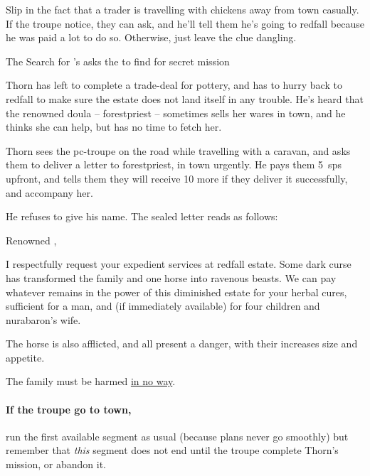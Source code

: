 Slip in the fact that a trader is travelling with chickens away from \gls{town} casually.
If the troupe notice, they can ask, and he'll tell them he's going to \gls{redfall} because he was paid a lot to do so.
Otherwise, just leave the clue dangling.

{The Search for }%
{'s  asks the  to find  for secret mission}%
\label{nonstarter}

\begin{exampletext}
  Thorn has left to complete a trade-deal for pottery, and has to hurry back to \gls{redfall} to make sure the estate does not land itself in any trouble.
  He's heard that the renowned \gls{doula} -- \gls{forestpriest} -- sometimes sells her wares in \gls{town}, and he thinks she can help, but has no time to fetch her.
\end{exampletext}

Thorn sees the \gls{pc}-troupe on the road while travelling with a caravan, and asks them to deliver a letter to \gls{forestpriest}, in \gls{town} urgently.
He pays them 5~\glspl{sp} upfront, and tells them they will receive 10 more if they deliver it successfully, and accompany her.

He refuses to give his name.
The sealed letter reads as follows:

\null
\begin{speechtext}
  Renowned ,

  I respectfully request your expedient services at \gls{redfall} estate.
  Some dark curse has transformed the family and one horse into ravenous beasts.
  We can pay whatever remains in the power of this diminished estate for your herbal cures, sufficient for a man, and (if immediately available) for four children and \gls{nurabaron}'s wife.

  The horse is also afflicted, and all present a danger, with their increases size and appetite.

  The family must be harmed \underline{in no way}.
\end{speechtext}

\thornSeneschal

\label{thorn}

\paragraph{If the troupe go to \gls{town},}
run the first available \gls{segment} as usual (because plans never go smoothly) but remember that \emph{this} \gls{segment} does not end until the troupe complete Thorn's mission, or abandon it.

